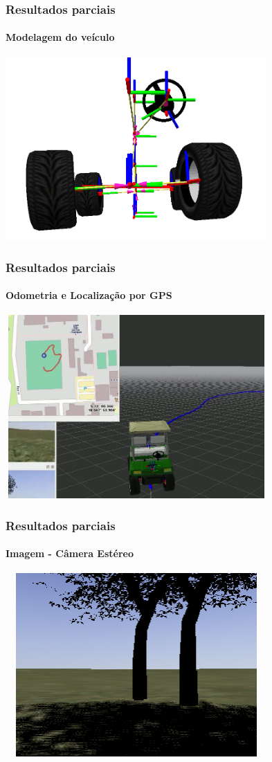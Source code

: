 \documentclass[brazil]{beamer}
\begin{document}
\begin{frame}
\frametitle{Resultados parciais}
\framesubtitle{Modelagem do veículo}
\includegraphics[width=10cm,height=7cm,]{../img/carina_rviz_uneven_susp.png}
\end{frame}


\begin{frame}
\frametitle{Resultados parciais}
\framesubtitle{Odometria e Localização por GPS}
\includegraphics[width=10cm,height=7cm,]{../img/arq_odogps.png}
\end{frame}


\begin{frame}
\frametitle{Resultados parciais}
\framesubtitle{Imagem - Câmera Estéreo}
\includegraphics[width=10cm,height=7cm,]{../img/arq_image.png}
\end{frame}
\end{document}

